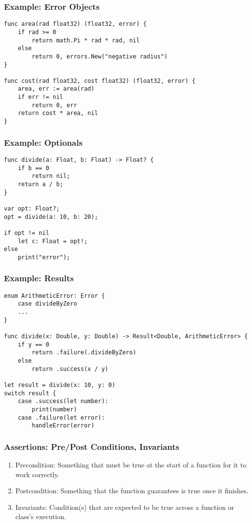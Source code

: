 \documentclass{article}
\begin{document}
\subsubsection*{Example: Error Objects}
\begin{verbatim}
func area(rad float32) (float32, error) {
    if rad >= 0
        return math.Pi * rad * rad, nil
    else
        return 0, errors.New("negative radius")
}

func cost(rad float32, cost float32) (float32, error) {
    area, err := area(rad)
    if err != nil
        return 0, err
    return cost * area, nil
}
\end{verbatim}

\subsubsection*{Example: Optionals}
\begin{verbatim}
func divide(a: Float, b: Float) -> Float? {
    if b == 0
        return nil;
    return a / b;
}

var opt: Float?;
opt = divide(a: 10, b: 20);

if opt != nil
    let c: Float = opt!;
else
    print("error");
\end{verbatim}

\subsubsection*{Example: Results}
\begin{verbatim}
enum ArithmeticError: Error {
    case divideByZero
    ...
}

func divide(x: Double, y: Double) -> Result<Double, ArithmeticError> {
    if y == 0
        return .failure(.divideByZero)
    else
        return .success(x / y)

let result = divide(x: 10, y: 0)
switch result {
    case .success(let number):
        print(number)
    case .failure(let error):
        handleError(error)
\end{verbatim}

\subsubsection*{Assertions: Pre/Post Conditions, Invariants}
\begin{enumerate}[label=(\roman*)]
\item Precondition: Something that must be true at the start of a
  function for it to work correctly.
\item Postcondition: Something that the function guarantees is true
  once it finishes.
\item Invariants: Condition(s) that are expected to be true across a
  function or class's execution.
\end{enumerate}
\end{document}
